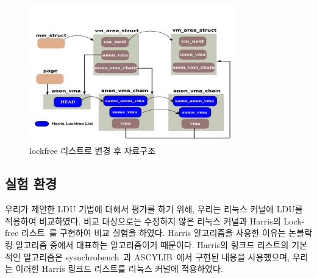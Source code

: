  
 \begin{figure}[h]
    \centering
    \includegraphics[width=0.8\textwidth]{fig/lockfree_2}
    \caption{lockfree 리스트로 변경 후 자료구조}
  \label{fig:lockfree_2}
\end{figure}
 


\subsection{실험 환경}



우리가 제안한 LDU 기법에 대해서 평가를 하기 위해, 우리는 리눅스 커널에 LDU를 적용하여 비교하였다.
비교 대상으로는 수정하지 않은 리눅스 커널과 Harris의 Lock-free 리스트~\cite{Harris2001Lockfree}를
 구현하여 비교 실험을 하였다.
Harris 알고리즘을 사용한 이유는 논블락킹 알고리즘 중에서 대표하는 알고리즘이기 때문이다. 
Harris의 링크드 리스트의 기본적인 알고리즘은 sysnchrobench~\cite{Gramoli2015Synchrobench}과
ASCYLIB~\cite{David2015ASYNCHRONIZED}에서 구현된 내용을 사용했으며, 우리는 이러한 Harris 링크드 
리스트를  리눅스 커널에 적용하였다. 

